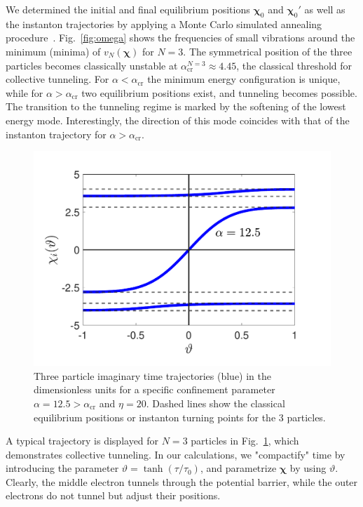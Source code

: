 \documentclass[aps, prb, floatfix, twocolumn, notitlepage, superscriptaddress, 10pt]{revtex4-2}
\def \ttau {{\tau}}
\newcommand{\n}{N}
\newcommand{\bchi}{\boldsymbol \chi}
\newcommand{\1}{{1\hspace*{-0.5ex} \textrm{l} \hspace*{0.5ex}}}
\begin{document}
We  determined the  initial and final equilibrium positions $\bchi_0$ and $\bchi_0'$ 
as well as the instanton trajectories  by applying a Monte Carlo simulated annealing  procedure~\cite{VANDERBILT1984259}. 
Fig.~\ref{fig:omega} shows the frequencies of  small vibrations around the minimum (minima) of 
$v_\n(\bchi)$ for $N=3$. The symmetrical position of the three particles becomes classically unstable 
at $\alpha^{N=3}_\text{cr}\approx {4.45}$,  the classical 
threshold  for collective tunneling.  For $\alpha<\alpha_\text{cr}$  the minimum energy configuration is unique,  
while for  $\alpha>\alpha_\text{cr}$ two equilibrium positions exist,  and tunneling becomes possible.  
The transition to the tunneling regime is marked by the softening of the lowest energy  mode. 
Interestingly,  the direction of this mode coincides with that of the instanton trajectory
for $\alpha>\alpha_\text{cr}$. 


%
\begin{figure}[t!]
    \begin{center}
    	\includegraphics[width=0.95\columnwidth]{Fig_3Particle_Trajectory.pdf}		
     \caption{ Three particle imaginary time trajectories (blue) in the dimensionless units for a specific confinement parameter $\alpha = 12.5>\alpha_\text{cr}$ and $\eta = 20$. Dashed lines show the classical equilibrium positions or instanton turning points for the 3 particles. 
     }
     \label{fig:traj}
    \end{center}
\end{figure}  

A typical trajectory is displayed for $N=3$ particles in Fig.~\ref{fig:traj}, which demonstrates 
 collective tunneling. In our calculations,  we "compactify" time by introducing the parameter 
$\vartheta = \tanh( {\ttau}/{\ttau_0})$, and parametrize $\bchi$  by using $\vartheta$.
 Clearly, the middle electron tunnels through the potential barrier, while the outer 
 electrons  do not tunnel but  adjust their positions. 
\end{document}
